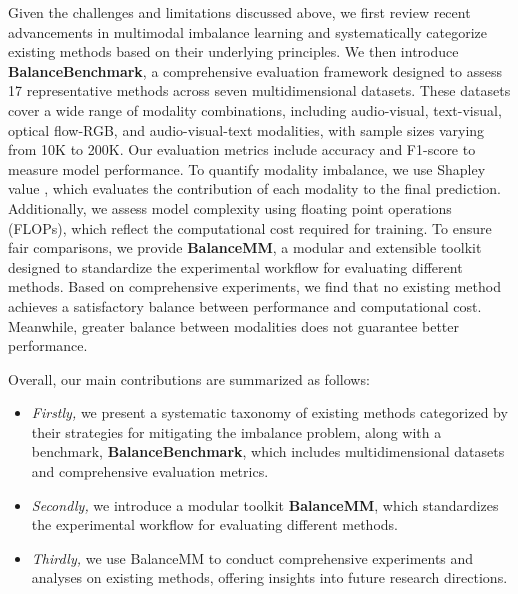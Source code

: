 Given the challenges and limitations discussed above, we first review recent advancements in multimodal imbalance learning and systematically categorize existing methods based on their underlying principles. We then introduce \textbf{BalanceBenchmark}, a comprehensive evaluation framework designed to assess 17 representative methods across seven multidimensional datasets. These datasets cover a wide range of modality combinations, including audio-visual, text-visual, optical flow-RGB, and audio-visual-text modalities, with sample sizes varying from 10K to 200K. Our evaluation metrics include accuracy and F1-score to measure model performance. To quantify modality imbalance, we use Shapley value \cite{shapley:book1952}, which evaluates the contribution of each modality to the final prediction. Additionally, we assess model complexity using floating point operations (FLOPs), which reflect the computational cost required for training. To ensure fair comparisons, we provide \textbf{BalanceMM}, a modular and extensible toolkit designed to standardize the experimental workflow for evaluating different methods. Based on comprehensive experiments, we find that no existing method achieves a satisfactory balance between performance and computational cost. Meanwhile, greater balance between modalities does not guarantee better performance.

Overall, our main contributions are summarized as follows:
\begin{itemize}
\item \textit{Firstly,} we present a systematic taxonomy of existing methods categorized by their strategies for mitigating the imbalance problem, along with a benchmark, \textbf{BalanceBenchmark}, which includes multidimensional datasets and comprehensive evaluation metrics.
\item \textit{Secondly,} we introduce a modular toolkit \textbf{BalanceMM}, which standardizes the experimental workflow for evaluating different methods.
\item \textit{Thirdly,} we use BalanceMM to conduct comprehensive experiments and analyses on existing methods, offering insights into future research directions.
\end{itemize}

